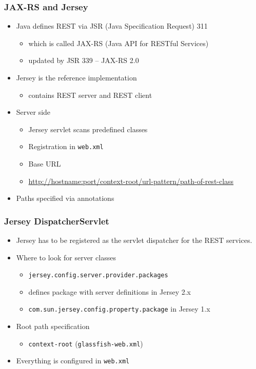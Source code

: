 \documentclass[10pt,xcolor=pdflatex]{beamer}
\begin{document}
\begin{frame}[containsverbatim]\frametitle{JAX-RS and Jersey}
\begin{itemize}
	\item Java defines REST via JSR (Java Specification Request) 311
	  \begin{itemize}
		\item which is called JAX-RS (Java API for RESTful Services)
        \item updated by JSR 339 -- JAX-RS 2.0
	  \end{itemize}
    \item Jersey is the reference implementation
	  \begin{itemize}
		\item contains REST server and REST client
	  \end{itemize} 
    \item Server side
	  \begin{itemize}
		\item Jersey servlet scans predefined classes
		\item Registration in \texttt{web.xml}
		\item Base URL
        \item[] \url{http://hostname:port/context-root/url-pattern/path-of-rest-class}
	  \end{itemize}
    \item Paths specified via annotations
\end{itemize}
\end{frame}


\begin{frame}[containsverbatim]\frametitle{Jersey DispatcherServlet}
\begin{itemize}
	\item Jersey has to be registered as the servlet dispatcher for the REST services.
    \item Where to look for server classes
	  \begin{itemize}
		\item \texttt{jersey.config.server.provider.packages} 
        \item[] defines package with server definitions in Jersey 2.x
        \item \texttt{com.sun.jersey.config.property.package} in Jersey 1.x
	  \end{itemize}
    \item Root path specification
      \begin{itemize}
        \item \texttt{context-root} (\texttt{glassfish-web.xml})
      \end{itemize}
    \item Everything is configured in \texttt{web.xml}
\end{itemize}
\end{frame}
\end{document}

